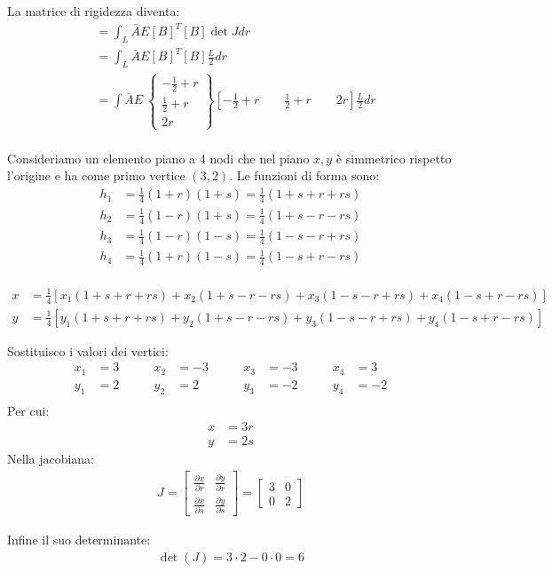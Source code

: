 \begin{esempioBox}
La matrice di rigidezza diventa:
\begin{align*}
  [K]   &=  \int_L \bar{A}E[B]^T[B]  \det J dr\\
         &=  \int_L \bar{A}E[B]^T[B]  \frac{L}{2} dr\\  
    &=  \int \bar{A}E\   \begin{Bmatrix}
        -\frac{1}{2}+r\\ \frac{1}{2}+r \\ 2r \end{Bmatrix} \left[  -\frac{1}{2}+r\qquad \frac{1}{2}+r \qquad 2r \right]\frac{L}{2}
    dr\\
\end{align*}
    
\end{esempioBox}

\begin{esempioBox}
    Consideriamo un elemento piano a 4 nodi che nel piano $x,y$ è simmetrico rispetto l'origine e ha come primo vertice $(3,2)$. Le funzioni di forma sono:
    \begin{align*}
    h_1&=\frac{1}{4}(1+r)(1+s)=\frac{1}{4}(1+s+r+rs)\\
    h_2&=\frac{1}{4}(1-r)(1+s)=\frac{1}{4}(1+s-r-rs)\\
    h_3&=\frac{1}{4}(1-r)(1-s)=\frac{1}{4}(1-s-r+rs)\\
    h_4&=\frac{1}{4}(1+r)(1-s)=\frac{1}{4}(1-s+r-rs)\\
\end{align*}

\begin{align*}
    x &= \frac{1}{4}\left[x_1(1+s+r+rs) + x_2(1+s-r-rs) + x_3(1-s-r+rs) + x_4(1-s+r-rs)\right]\\
    y &= \frac{1}{4}\left[y_1(1+s+r+rs) + y_2(1+s-r-rs) + y_3(1-s-r+rs) + y_4(1-s+r-rs)\right]
\end{align*}

Sostituisco i valori dei vertici:
\begin{align*}
    x_1&= 3 \qquad &x_2&=-3 \qquad &x_3&=-3 \qquad &x_4&=3\\
     y_1&= 2 \qquad &y_2&=2 \qquad &y_3&=-2 \qquad &y_4&=-2\\
\end{align*}
Per cui:
\begin{align*}
    x&=3r\\
    y&=2s
\end{align*}
Nella jacobiana:
\begin{align*}
    J = \begin{bmatrix}
        \frac{\partial x}{\partial r} & \frac{\partial y}{\partial r}\\
        \frac{\partial x}{\partial s} & \frac{\partial y}{\partial s}
    \end{bmatrix} = 
    \begin{bmatrix}
        3 & 0\\
        0 & 2
    \end{bmatrix}
\end{align*}

Infine il suo determinante:
\begin{align*}
    \det(J) = 3 \cdot 2 - 0 \cdot 0 = 6
\end{align*}





\end{esempioBox}
